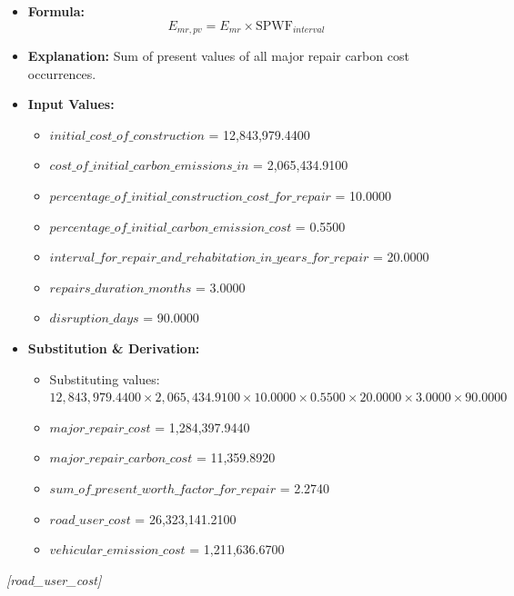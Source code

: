 \documentclass[12pt,a4paper]{article}
\begin{document}
\begin{itemize}
  \item \textbf{Formula:} $$E_{mr,pv} = E_{mr} \times \text{SPWF}_{interval}$$
  \item \textbf{Explanation:} Sum of present values of all major repair carbon cost occurrences.
  \item \textbf{Input Values:}
  \begin{itemize}
    \item $initial\_cost\_of\_construction$ = 12,843,979.4400
    \item $cost\_of\_initial\_carbon\_emissions\_in$ = 2,065,434.9100
    \item $percentage\_of\_initial\_construction\_cost\_for\_repair$ = 10.0000
    \item $percentage\_of\_initial\_carbon\_emission\_cost$ = 0.5500
    \item $interval\_for\_repair\_and\_rehabitation\_in\_years\_for\_repair$ = 20.0000
    \item $repairs\_duration\_months$ = 3.0000
    \item $disruption\_days$ = 90.0000
  \end{itemize}
  \item \textbf{Substitution \& Derivation:}
  \begin{itemize}
    \item Substituting values: $12,843,979.4400 \times 2,065,434.9100 \times 10.0000 \times 0.5500 \times 20.0000 \times 3.0000 \times 90.0000$
    \item $major\_repair\_cost$ = 1,284,397.9440
    \item $major\_repair\_carbon\_cost$ = 11,359.8920
    \item $sum\_of\_present\_worth\_factor\_for\_repair$ = 2.2740
    \item $road\_user\_cost$ = 26,323,141.2100
    \item $vehicular\_emission\_cost$ = 1,211,636.6700
  \end{itemize}
\end{itemize}


\textit{[road\_user\_cost]}
\end{document}
